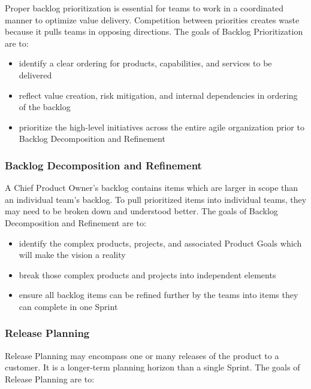 \documentclass[12pt,a4paper,parskip=full]{scrartcl}
\begin{document}
Proper backlog prioritization is essential for teams to work in a coordinated manner to optimize value delivery. Competition between priorities creates waste because it pulls teams in opposing directions. The goals of Backlog Prioritization are to:

\begin{itemize}
\itemsep1pt\parskip0pt
\item
  identify a clear ordering for products, capabilities, and services to
  be delivered
\item
  reflect value creation, risk mitigation, and internal dependencies in
  ordering of the backlog
\item
  prioritize the high-level initiatives across the entire agile
  organization prior to Backlog Decomposition and Refinement
\end{itemize}

\subsubsection{Backlog Decomposition and
Refinement}\label{backlog-decomposition-and-refinement}

A Chief Product Owner's backlog contains items which are larger in scope than an individual team's backlog. To pull prioritized items into individual teams, they may need to be broken down and understood better. The goals of Backlog Decomposition and Refinement are to:

\begin{itemize}
\itemsep1pt\parskip0pt
\item
  identify the complex products, projects, and associated Product Goals which will make the vision a reality
\item
  break those complex products and projects into independent elements
\item
  ensure all backlog items can be refined further by the teams into items they can complete in one Sprint
\end{itemize}

\subsubsection{Release Planning}\label{Release-planning}

Release Planning may encompass one or many releases of the product to a customer. It is a longer-term planning horizon than a single Sprint. The goals of Release Planning are to:
\end{document}
